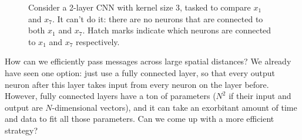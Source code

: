 \begin{figure}
{
    }
    \caption{Consider a 2-layer CNN with kernel size 3, tasked to compare $x_1$ and $x_7$. It can't do it: there are no neurons that are connected to both $x_1$ and $x_7$. Hatch marks indicate which neurons are connected to $x_1$ and $x_7$ respectively.}
    \label{fig:transformers:CNN_limitations}
\end{figure}

How can we efficiently pass messages across large spatial distances? We already have seen one option: just use a fully connected layer, so that every output neuron after this layer takes input from every neuron on the layer before. However, fully connected layers have a ton of parameters ($N^2$ if their input and output are $N$-dimensional vectors), and it can take an exorbitant amount of time and data to fit all those parameters. Can we come up with a more efficient strategy?

